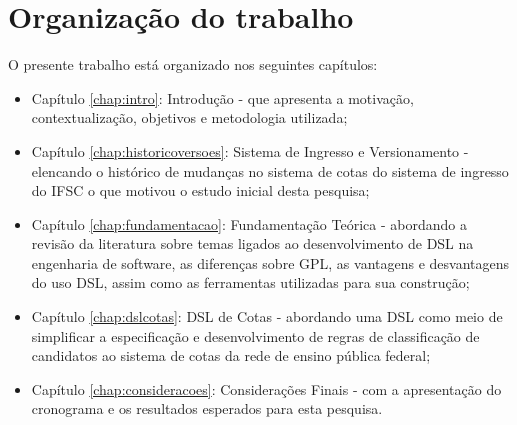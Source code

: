 \section{Organização do trabalho}
\label{organizacao}

O presente trabalho está organizado nos seguintes capítulos:

\begin{itemize}
    \item Capítulo \ref{chap:intro}: Introdução - que apresenta a motivação, contextualização, objetivos e metodologia utilizada;
    \item Capítulo \ref{chap:historicoversoes}: Sistema de Ingresso e Versionamento - elencando o histórico de mudanças no sistema de cotas do sistema de ingresso do \gls{IFSC} o que motivou o estudo inicial desta pesquisa;
    \item Capítulo \ref{chap:fundamentacao}: Fundamentação Teórica - abordando a revisão da literatura sobre temas ligados ao desenvolvimento de \gls{DSL} na engenharia de software, as diferenças sobre \gls{GPL}, as vantagens e desvantagens do uso  \gls{DSL}, assim como as ferramentas utilizadas para sua construção;
    \item Capítulo \ref{chap:dslcotas}: DSL de Cotas - abordando uma \gls{DSL} como meio de simplificar a especificação e desenvolvimento de regras de classificação de candidatos ao sistema de cotas da rede de ensino pública federal;
    \item Capítulo \ref{chap:consideracoes}: Considerações Finais - com a apresentação do cronograma e os resultados esperados para esta pesquisa.
\end{itemize}

